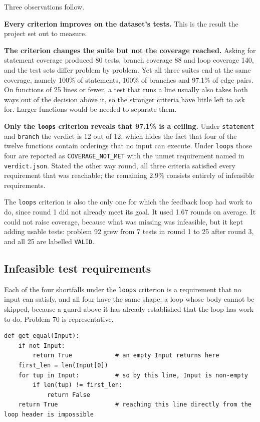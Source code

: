 \documentclass[11pt,a4paper]{article}
\begin{document}
Three observations follow.

\textbf{Every criterion improves on the dataset's tests.} This is the result the project set out to measure.

\textbf{The criterion changes the suite but not the coverage reached.} Asking for statement coverage produced
80 tests, branch coverage 88 and loop coverage 140, and the test sets differ problem by problem. Yet all three
suites end at the same coverage, namely 100\% of statements, 100\% of branches and 97.1\% of edge pairs. On
functions of 25 lines or fewer, a test that runs a line usually also takes both ways out of the decision above
it, so the stronger criteria have little left to ask for. Larger functions would be needed to separate them.

\textbf{Only the \texttt{loops} criterion reveals that 97.1\% is a ceiling.} Under \texttt{statement} and
\texttt{branch} the verdict is 12 out of 12, which hides the fact that four of the twelve functions contain
orderings that no input can execute. Under \texttt{loops} those four are reported as
\texttt{COVERAGE\_NOT\_MET} with the unmet requirement named in \texttt{verdict.json}. Stated the other way
round, all three criteria satisfied every requirement that was reachable; the remaining 2.9\% consists entirely
of infeasible requirements.

The \texttt{loops} criterion is also the only one for which the feedback loop had work to do, since round 1 did
not already meet its goal. It used 1.67 rounds on average. It could not raise coverage, because what was
missing was infeasible, but it kept adding usable tests: problem 92 grew from 7 tests in round 1 to 25 after
round 3, and all 25 are labelled \texttt{VALID}.

\subsection{Infeasible test requirements}

Each of the four shortfalls under the \texttt{loops} criterion is a requirement that no input can satisfy, and
all four have the same shape: a loop whose body cannot be skipped, because a guard above it has already
established that the loop has work to do. Problem 70 is representative.

\begin{lstlisting}[style=py]
def get_equal(Input):
    if not Input:
        return True            # an empty Input returns here
    first_len = len(Input[0])
    for tup in Input:          # so by this line, Input is non-empty
        if len(tup) != first_len:
            return False
    return True                # reaching this line directly from the loop header is impossible
\end{lstlisting}
\end{document}
